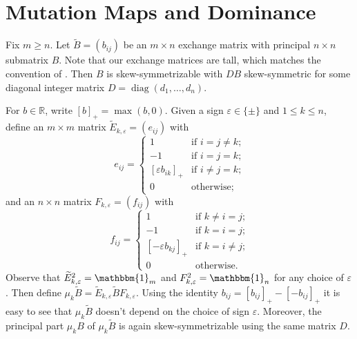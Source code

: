 \documentclass{amsart}
\numberwithin{theorem}{section}
\newcommand{\bfb}{\boldsymbol{b}}
\newcommand{\RR}{\mathbb{R}}
\newcommand{\bOne}{\mathbbm{1}}
\newcommand{\diag}{\operatorname{diag}}
\begin{document}
  \section{Mutation Maps and Dominance}
  Fix $m\ge n$.
  Let $\widetilde B=(b_{ij})$ be an $m\times n$ exchange matrix with principal $n\times n$ submatrix $B$.
  Note that our exchange matrices are tall, which matches the convention of \cite{qin}.
  Then $B$ is skew-symmetrizable with $DB$ skew-symmetric for some diagonal integer matrix $D=\diag(d_1,\ldots,d_n)$.
 
  For $b\in\RR$, write $[b]_+=\max(b,0)$.
  Given a sign $\varepsilon\in\{\pm\}$ and $1\le k\le n$, define an $m\times m$ matrix $\widetilde E_{k,\varepsilon}=(e_{ij})$ with
  \begin{equation}
    \label{e:left mutation matrix}
    e_{ij}=\begin{cases} 1 & \text{if $i=j\ne k$;}\\ -1 & \text{if $i=j=k$;}\\ [\varepsilon b_{ik}]_+ & \text{if $i\ne j=k$;}\\ 0 & \text{otherwise;} \end{cases}
  \end{equation}
  and an $n\times n$ matrix $F_{k,\varepsilon}=(f_{ij})$ with
  \begin{equation}
    \label{eq:right mutation matrix}
    f_{ij}=\begin{cases} 1 & \text{if $k\ne i=j$;}\\ -1 & \text{if $k=i=j$;}\\ [-\varepsilon b_{kj}]_+ & \text{if $k=i\ne j$;}\\ 0 & \text{otherwise.} \end{cases}
  \end{equation}
  Observe that $\widetilde E^2_{k,\varepsilon}=\bOne_m$ and $F^2_{k,\varepsilon}=\bOne_n$ for any choice of $\varepsilon$.
  Then define $\mu_k\widetilde B=\widetilde E_{k,\varepsilon} \widetilde B F_{k,\varepsilon}$.
  Using the identity $b_{ij}=[b_{ij}]_+-[-b_{ij}]_+$ it is easy to see that $\mu_k\widetilde B$ doesn't depend on the choice of sign $\varepsilon$.
  Moreover, the principal part $\mu_k B$ of $\mu_k\widetilde B$ is again skew-symmetrizable using the same matrix $D$.
\end{document}
